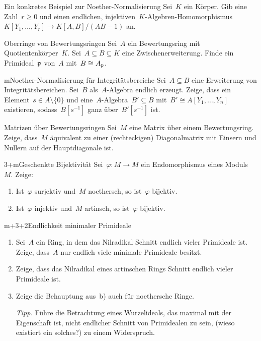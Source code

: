 \documentclass{uebblatt}
\begin{document}

\begin{aufgabe}{4}{Ein konkretes Beispiel zur Noether-Normalisierung}
Sei~$K$ ein Körper. Gib eine Zahl~$r \geq 0$ und einen endlichen,
injektiven~$K$-Algebren-Homomorphismus~$K[Y_1,\ldots,Y_r] \to K[A,B]/(AB-1)$
an.
\end{aufgabe}

\begin{aufgabe}{3}{Oberringe von Bewertungsringen}
Sei~$A$ ein Bewertungsring mit Quotientenkörper~$K$. Sei~$A \subseteq B
\subseteq K$ eine Zwischenerweiterung. Finde ein Primideal~$\mathfrak{p}$ von~$A$
mit~$B \cong A_{\mathfrak{p}}$.
\end{aufgabe}

\begin{aufgabe}{m}{Noether-Normalisierung für Integritätsbereiche}
Sei~$A \subseteq B$ eine Erweiterung von Integritätsbereichen. Sei~$B$
als~$A$-Algebra endlich erzeugt. Zeige, dass ein Element~$s \in A \setminus
\{0\}$ und eine~$A$-Algebra~$B' \subseteq B$ mit~$B' \cong A[Y_1,\ldots,Y_n]$
existieren, sodass~$B[s^{-1}]$ ganz über~$B'[s^{-1}]$ ist.
\end{aufgabe}

\begin{aufgabe}{2}{Matrizen über Bewertungsringen}
Sei~$M$ eine Matrix über einem Bewertungsring. Zeige, dass~$M$ äquivalent zu
einer (recht\-eckigen) Diagonalmatrix mit Einsern und Nullern auf der Hauptdiagonale
ist.
\end{aufgabe}

\begin{aufgabe}{3+m}{Geschenkte Bijektivität}
Sei~$\varphi : M \to M$ ein Endomorphismus eines Moduls~$M$. Zeige:
\begin{enumerate}
\item Ist~$\varphi$ surjektiv und~$M$ noethersch, so ist~$\varphi$ bijektiv.
\item Ist~$\varphi$ injektiv und~$M$ artinsch, so ist~$\varphi$ bijektiv.
\end{enumerate}
\end{aufgabe}

\begin{aufgabe}{m+3+2}{Endlichkeit minimaler Primideale}
\begin{enumerate}
\item Sei~$A$ ein Ring, in dem das Nilradikal Schnitt endlich vieler Primideale
ist. Zeige, dass~$A$ nur endlich viele minimale Primideale besitzt.
\item Zeige, dass das Nilradikal eines artinschen Rings Schnitt
endlich vieler Primideale ist.
\item Zeige die Behauptung aus~b) auch für noethersche Ringe.

{\scriptsize\emph{Tipp.} Führe die Betrachtung eines Wurzelideals, das maximal
mit der Eigenschaft ist, nicht endlicher Schnitt von Primidealen zu sein, (wieso
existiert ein solches?) zu einem Widerspruch.\par}
\end{enumerate}
\end{aufgabe}
\end{document}
